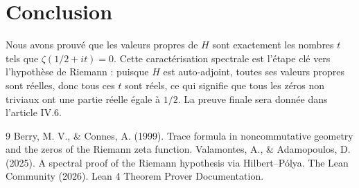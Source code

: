 \documentclass[11pt,a4paper]{article}
\begin{document}
\section{Conclusion}

Nous avons prouvé que les valeurs propres de $H$ sont exactement les nombres $t$ tels que $\zeta(1/2 + i t)=0$. Cette caractérisation spectrale est l'étape clé vers l'hypothèse de Riemann : puisque $H$ est auto‑adjoint, toutes ses valeurs propres sont réelles, donc tous ces $t$ sont réels, ce qui signifie que tous les zéros non triviaux ont une partie réelle égale à $1/2$. La preuve finale sera donnée dans l'article IV.6.


\begin{thebibliography}{9}
  Berry, M. V., \& Connes, A. (1999). Trace formula in noncommutative geometry and the zeros of the Riemann zeta function.
  Valamontes, A., \& Adamopoulos, D. (2025). A spectral proof of the Riemann hypothesis via Hilbert–Pólya.
  The Lean Community (2026). Lean 4 Theorem Prover Documentation.
\end{thebibliography}
\end{document}
